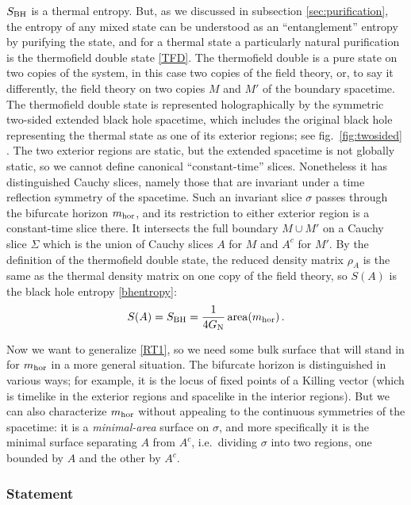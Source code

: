 \documentclass[11pt]{article}
\newcommand{\GN}{G_{\rm N}}
\DeclareMathOperator{\area}{area}
\begin{document}
$S_{\rm BH}$ is a thermal entropy. But, as we discussed in subsection \ref{sec:purification}, the entropy of any mixed state can be understood as an ``entanglement'' entropy by purifying the state, and for a thermal state a particularly natural purification is the thermofield double state \eqref{TFD}. The thermofield double is a pure state on two copies of the system, in this case two copies of the field theory, or, to say it differently, the field theory on two copies $M$ and $M'$ of the boundary spacetime. The thermofield double state is represented holographically by the symmetric two-sided extended black hole spacetime, which includes the original black hole representing the thermal state as one of its exterior regions; see fig.\ \ref{fig:twosided} \cite{Maldacena:2001kr}. The two exterior regions are static, but the extended spacetime is not globally static, so we cannot define canonical ``constant-time'' slices. Nonetheless it has distinguished Cauchy slices, namely those that are invariant under a time reflection symmetry of the spacetime. Such an invariant slice $\sigma$ passes through the bifurcate horizon $m_{\rm hor}$, and its restriction to either exterior region is a constant-time slice there. It intersects the full boundary $M\cup M'$ on a Cauchy slice $\Sigma$ which is the union of Cauchy slices $A$ for $M$ and $A^c$ for $M'$. By the definition of the thermofield double state, the reduced density matrix $\rho_A$ is the same as the thermal density matrix on one copy of the field theory, so $S(A)$ is the black hole entropy \eqref{bhentropy}:
\begin{equation}\label{RT1}
S(A) = S_{\rm BH} = \frac1{4\GN}\area(m_{\rm hor})\,.
\end{equation}

Now we want to generalize \eqref{RT1}, so we need some bulk surface that will stand in for $m_{\rm hor}$ in a more general situation. The bifurcate horizon is distinguished in various ways; for example, it is the locus of fixed points of a Killing vector (which is timelike in the exterior regions and spacelike in the interior regions). But we can also characterize $m_{\rm hor}$ without appealing to the continuous symmetries of the spacetime: it is a \emph{minimal-area} surface on $\sigma$, and more specifically it is the minimal surface separating $A$ from $A^c$, i.e.\ dividing $\sigma$ into two regions, one bounded by $A$ and the other by $A^c$.


\subsubsection{Statement}
\label{sec:RT statement}
\end{document}
